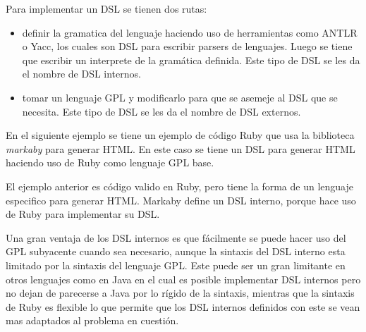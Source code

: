 Para implementar un DSL se tienen dos rutas:
\begin{itemize}
\item definir la gramatica del lenguaje haciendo uso de herramientas como
  ANTLR o Yacc, los cuales son DSL para escribir parsers de lenguajes. Luego
  se tiene que escribir un interprete de la gramática definida. Este tipo
  de DSL se les da el nombre de DSL internos.
\item tomar un lenguaje GPL y modificarlo para que se asemeje al DSL que
  se necesita. Este tipo de DSL se les da el nombre de DSL externos.
\end{itemize}

En el siguiente ejemplo se tiene un ejemplo de código Ruby que usa la biblioteca
\textit{markaby} para generar HTML. En este caso se tiene un DSL para generar HTML haciendo
uso de Ruby como lenguaje GPL base.


El ejemplo anterior es código valido en Ruby, pero tiene la forma de un lenguaje
especifico para generar HTML. Markaby define un DSL interno, porque hace uso
de Ruby para implementar su DSL.

Una gran ventaja de los DSL internos es que fácilmente se puede hacer uso del GPL
subyacente cuando sea necesario, aunque la sintaxis del DSL interno esta limitado
por la sintaxis del lenguaje GPL. Este puede ser un gran limitante en otros lenguajes
como en Java en el cual es posible implementar DSL internos pero no dejan de parecerse a Java por lo rígido de la sintaxis, mientras que la sintaxis de Ruby es
flexible lo que permite que los DSL internos definidos con este se vean mas
adaptados al problema en cuestión.
